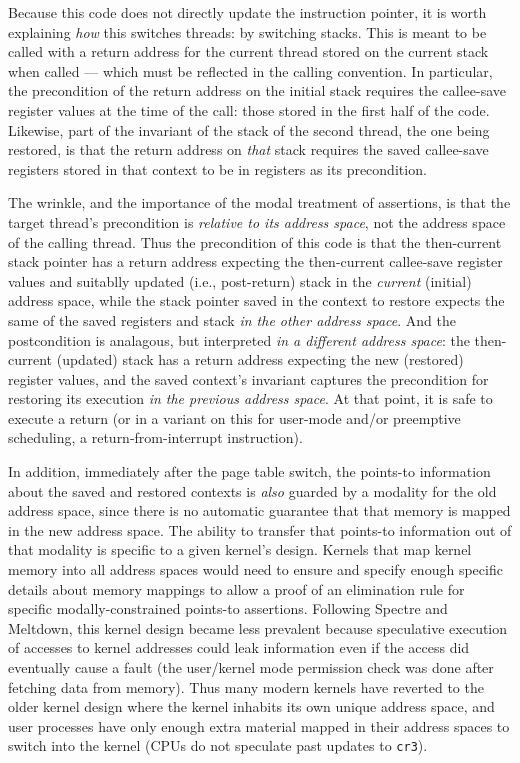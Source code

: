 Because this code does not directly update the instruction pointer, it is worth explaining \emph{how} this switches threads: by switching stacks. This is meant to be called with a return address for the current thread stored on the current stack when called --- which must be reflected in the calling convention. In particular, the precondition of the return address on the initial stack requires the callee-save register values at the time of the call: those stored in the first half of the code.
Likewise, part of the invariant of the stack of the second thread, the one being restored, is that the return address on \emph{that} stack requires the saved callee-save registers stored in that context to be in registers as its precondition.

The wrinkle, and the importance of the modal treatment of assertions, is that the target thread's precondition is \emph{relative to its address space}, not the address space of the calling thread.
Thus the precondition of this code is that the then-current stack pointer has a return address expecting the then-current callee-save register values and suitablly updated (i.e., post-return) stack in the \emph{current} (initial) address space, while the stack pointer saved in the context to restore expects the same of the saved registers and stack \emph{in the other address space}. And the postcondition is analagous, but interpreted \emph{in a different address space}: the then-current (updated) stack has a return address expecting the new (restored) register values, and the saved context's invariant captures the precondition for restoring its execution \emph{in the previous address space}. At that point, it is safe to execute a return (or in a variant on this for user-mode and/or preemptive scheduling, a return-from-interrupt instruction).

In addition, immediately after the page table switch, the points-to information about the saved and restored contexts is \emph{also} guarded by a modality for the old address space, since there is no automatic guarantee that that memory is mapped in the new address space.  The ability to transfer that points-to information out of that modality is specific to a given kernel's design. Kernels that map kernel memory into all address spaces would need to ensure and specify enough specific details about memory mappings to allow a proof of an elimination rule for specific modally-constrained points-to assertions.
Following Spectre and Meltdown, this kernel design became less prevalent because speculative execution of accesses to kernel addresses could leak information even if the access did eventually cause a fault (the user/kernel mode permission check was done after fetching data from memory). Thus many modern kernels have reverted to the older kernel design where the kernel inhabits its own unique address space, and user processes have only enough extra material mapped in their address spaces to switch into the kernel (CPUs do not speculate past updates to \texttt{cr3}).


